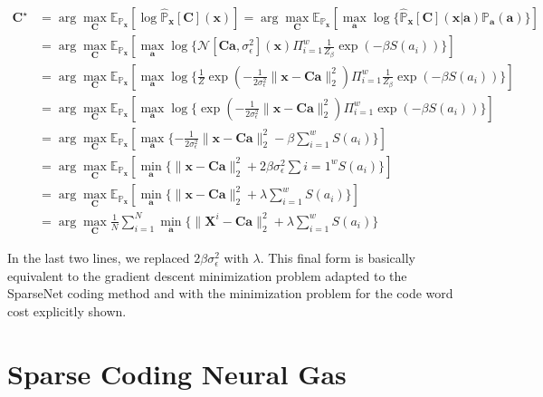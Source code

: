 \documentclass[12pt,a4paper,oneside,english]{UPBThesis}
\begin{document}
\begin{align*}
\textbf{C}^\star & = \arg\max_\textbf{C} \mathbb{E}_{\mathbb{P}_\textbf{x}} [ \log{\hat{\mathbb{P}}_\textbf{x}[\textbf{C}](\textbf{x})} ] = \arg\max_\textbf{C} \mathbb{E}_{\mathbb{P}_\textbf{x}} [ \max_\textbf{a} \log \{ {\hat{\mathbb{P}}_\textbf{x}[\textbf{C}](\textbf{x}\left|\right.\textbf{a})\mathbb{P}_\textbf{a}(\textbf{a})} \} ] \\
& = \arg\max_\textbf{C} \mathbb{E}_{\mathbb{P}_\textbf{x}} [ \max_\textbf{a} \log{ \{ \mathcal{N}[\textbf{C}\textbf{a},\sigma_\epsilon^2](\textbf{x}) \Pi_{i=1}^w{\frac{1}{Z_\beta} \exp(-\beta S(a_i))}} \} ] \\
& = \arg\max_\textbf{C} \mathbb{E}_{\mathbb{P}_\textbf{x}} [ \max_\textbf{a} \log{ \{ \frac{1}{Z} \exp \left( -\frac{1}{2\sigma_\epsilon^2} \| \textbf{x} - \textbf{C}\textbf{a} \|_2^2 \right) \Pi_{i=1}^w{\frac{1}{Z_\beta} \exp(-\beta S(a_i))} \} } ] \\
& = \arg\max_\textbf{C} \mathbb{E}_{\mathbb{P}_\textbf{x}} [ \max_\textbf{a} \log{ \{ \exp \left( -\frac{1}{2\sigma_\epsilon^2} \| \textbf{x} - \textbf{C}\textbf{a} \|_2^2 \right) \Pi_{i=1}^w{\exp(-\beta S(a_i))} \} } ] \\
& = \arg\max_\textbf{C} \mathbb{E}_{\mathbb{P}_\textbf{x}} [ \max_\textbf{a} \{ - \frac{1}{2\sigma_\epsilon^2} \| \textbf{x} - \textbf{C}\textbf{a} \|_2^2 - \beta \sum_{i=1}^w{S(a_i)} \} ] \\
& = \arg\max_\textbf{C} \mathbb{E}_{\mathbb{P}_\textbf{x}} [ \min_\textbf{a} \{ \| \textbf{x} - \textbf{C}\textbf{a} \|_2^2 + 2\beta\sigma_\epsilon^2\sum{i=1}^wS(a_i) \} ] \\
& = \arg\max_\textbf{C} \mathbb{E}_{\mathbb{P}_\textbf{x}} [ \min_\textbf{a} \{ \| \textbf{x} - \textbf{C}\textbf{a} \|_2^2 + \lambda\sum_{i=1}^wS(a_i) \} ] \\
& = \arg\max_\textbf{C} \frac{1}{N} \sum_{i=1}^N \min_\textbf{a} \{ \| \textbf{X}^i - \textbf{C}\textbf{a} \|_2^2 + \lambda\sum_{i=1}^wS(a_i) \}
\end{align*}

In the last two lines, we replaced $2\beta\sigma_\epsilon^2$ with $\lambda$. This final form is basically equivalent to the gradient descent minimization problem adapted to the SparseNet coding method and with the minimization problem for the code word cost explicitly shown.

\section{Sparse Coding Neural Gas}
\label{sec:SparseCodingNeuralGas}
\end{document}
